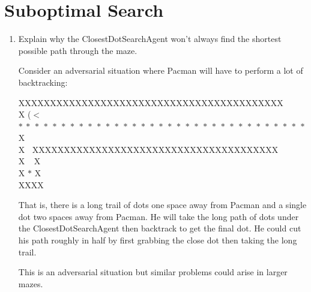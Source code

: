 \documentclass[fleqn]{hermans-hw}
\begin{document}
\section{Suboptimal Search}
\begin{enumerate}
	\item Explain why the ClosestDotSearchAgent won't always find the shortest possible path through the maze.
	
	Consider an adversarial situation where Pacman will have to perform a lot of backtracking:
	
	XXXXXXXXXXXXXXXXXXXXXXXXXXXXXXXXXXXXXXXXXX \\
	X ($<$ $* \ * \ * \ * \ * \ * \ * \ * \ * \ * \ * \ * \ * \ * \ * \ * \ * \ * \ * \ * \ * \ * \ * \ * \ * \ * \ * \ * \ * \ * \ * \ * \ * \ $X \\
	X$\ \ \ \ $XXXXXXXXXXXXXXXXXXXXXXXXXXXXXXXXXXXXXXX \\
	X $\ \ $ X \\
	X $*$ X \\
	XXXX
	
	That is, there is a long trail of dots one space away from Pacman and a single dot two spaces away from Pacman. He will take the long path of dots under the ClosestDotSearchAgent then backtrack to get the final dot. He could cut his path roughly in half by first grabbing the close dot then taking the long trail.
	
	This is an adversarial situation but similar problems could arise in larger mazes.
	\end{enumerate}
\end{document}
